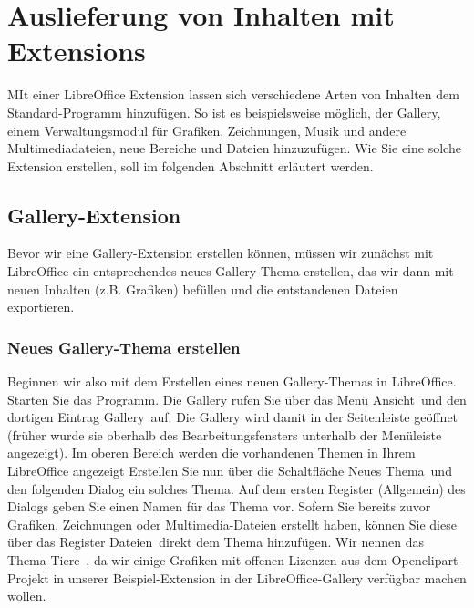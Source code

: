 \documentclass[a4paper,10pt,pagesize,titlepage]{scrbook}
\begin{document}
\chapter{Auslieferung von Inhalten mit Extensions}

MIt einer LibreOffice Extension lassen sich verschiedene Arten von Inhalten dem Standard-Programm hinzufügen. So ist es beispielsweise möglich, der Gallery, einem Verwaltungsmodul für Grafiken, Zeichnungen, Musik und andere Multimediadateien, neue Bereiche und Dateien hinzuzufügen. Wie Sie eine solche Extension erstellen, soll im folgenden Abschnitt erläutert werden.

\section{Gallery-Extension}

Bevor wir eine Gallery-Extension erstellen können, müssen wir zunächst mit LibreOffice ein entsprechendes neues Gallery-Thema erstellen, das wir dann mit neuen Inhalten (z.B. Grafiken) befüllen und die entstandenen Dateien exportieren.

\subsection{Neues Gallery-Thema erstellen}

Beginnen wir also mit dem Erstellen eines neuen Gallery-Themas in LibreOffice. Starten Sie das Programm. Die Gallery rufen Sie über das Menü \glqq Ansicht\grqq~und den dortigen Eintrag \glqq Gallery\grqq~auf. Die Gallery wird damit in der Seitenleiste geöffnet (früher wurde sie oberhalb des Bearbeitungsfensters unterhalb der Menüleiste angezeigt). Im oberen Bereich werden die vorhandenen Themen in Ihrem LibreOffice angezeigt Erstellen Sie nun über die Schaltfläche \glqq Neues Thema\grqq~und den folgenden Dialog ein solches Thema. Auf dem ersten Register (\glqq Allgemein\grqq) des Dialogs geben Sie einen Namen für das Thema vor. Sofern Sie bereits zuvor Grafiken, Zeichnungen oder Multimedia-Dateien erstellt haben, können Sie diese über das Register \glqq Dateien\grqq~direkt dem Thema hinzufügen. Wir nennen das Thema \glqq Tiere\grqq~, da wir einige Grafiken mit offenen Lizenzen aus dem Openclipart-Projekt in unserer Beispiel-Extension in der LibreOffice-Gallery verfügbar machen wollen.
\end{document}
